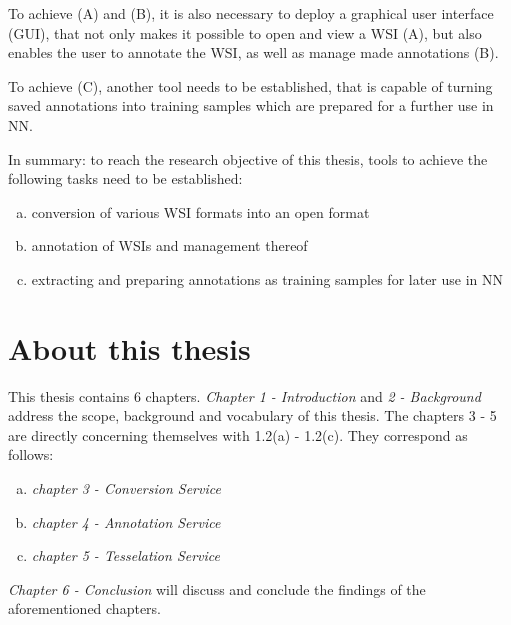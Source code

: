 To achieve (A) and (B), it is also necessary to deploy a graphical user interface (GUI), that not only makes it possible to open and view a WSI (A), but also enables the user to annotate the WSI, as well as manage made annotations (B).

To achieve (C), another tool needs to be established, that is capable of turning saved annotations into training samples which are prepared for a further use in NN.

In summary: to reach the research objective of this thesis, tools to achieve the following tasks need to be established:
\begin{enumerate}[(a)]
	\item conversion of various WSI formats into an open format
	\item annotation of WSIs and management thereof
	\item extracting and preparing annotations as training samples for later use in NN
\end{enumerate}

\section{About this thesis}
This thesis contains 6 chapters. \emph{Chapter 1 - Introduction} and \emph{2 - Background} address the scope, background and vocabulary of this thesis. The chapters 3 - 5 are directly concerning themselves with 1.2(a) - 1.2(c).  They correspond as follows:
\begin{enumerate}[(a):]
	\item \emph{chapter 3 - Conversion Service}
	\item \emph{chapter 4 - Annotation Service}
	\item \emph{chapter 5 - Tesselation Service}
\end{enumerate}
\emph{Chapter 6 - Conclusion} will discuss and conclude the findings of the aforementioned chapters.